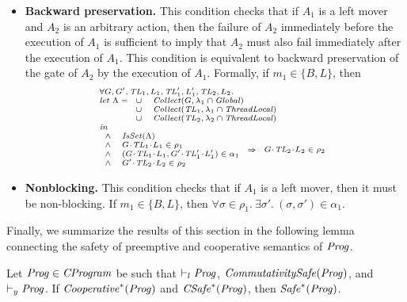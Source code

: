 \begin{itemize}
\item {\bf Backward preservation.}
This condition checks that if $A_1$ is a left mover and $A_2$ 
is an arbitrary action, then the failure of $A_2$ immediately before the execution of $A_1$ 
is sufficient to imply that $A_2$ must also fail immediately after the execution of $A_1$.
This condition is equivalent to backward preservation of the gate of $A_2$ by the execution of $A_1$.
Formally, if $m_1 \in \{B,L\}$, then 
\[
\scriptsize{
\begin{array}{l}
\forall \varsG,\varsG',\varsTL_1,\varsL_1,\varsTL'_1,\varsL'_1,\varsTL_2,\varsL_2. \\
\mathit{let}\ \Lambda =
\begin{array}[t]{ll}
\cup & \Collect(\varsG, \lins_1 \cap \Global) \\
\cup & \Collect(\varsTL_1, \lins_1 \cap \ThreadLocal) \\
\cup & \Collect(\varsTL_2, \lins_2 \cap \ThreadLocal) 
\end{array} \\
\mathit{in} \\
\begin{array}{ll}
\wedge & \IsSet(\Lambda) \\
\wedge & \MakeStore{\varsG}{\varsTL_1}{\varsL_1} \in \rho_1 \\
\wedge & (\MakeStore{\varsG}{\varsTL_1}{\varsL_1},\MakeStore{\varsG'}{\varsTL'_1}{\varsL'_1}) \in \alpha_1 \\
\wedge & \MakeStore{\varsG'}{\varsTL_2}{\varsL_2} \in \rho_2 \\
\end{array} 
\Rightarrow 
\begin{array}{l}
\MakeStore{\varsG}{\varsTL_2}{\varsL_2} \in \rho_2 
\end{array}
\end{array}
}
\]

\item {\bf Nonblocking.}
This condition checks that if $A_1$ is a left mover, then it must be non-blocking.
If $m_1 \in \{B, L\}$, then
$\forall \sigma \in \rho_1.\ \exists \sigma'.\ (\sigma, \sigma') \in \alpha_1$.
\end{itemize}

Finally, we summarize the results of this section in the following lemma connecting the safety
of preemptive and cooperative semantics of $\mathit{Prog}$.
\begin{lemma}
Let $\mathit{Prog} \in \mathit{CProgram}$ be such that $\vdash_l \mathit{Prog}$, $\mathit{CommutativitySafe}(\mathit{Prog})$, and $\vdash_y \mathit{Prog}$.
If $\mathit{Cooperative}^*(\mathit{Prog})$ and $\mathit{CSafe}^*(\mathit{Prog})$, then $\mathit{Safe}^*(\mathit{Prog})$.
\end{lemma}
